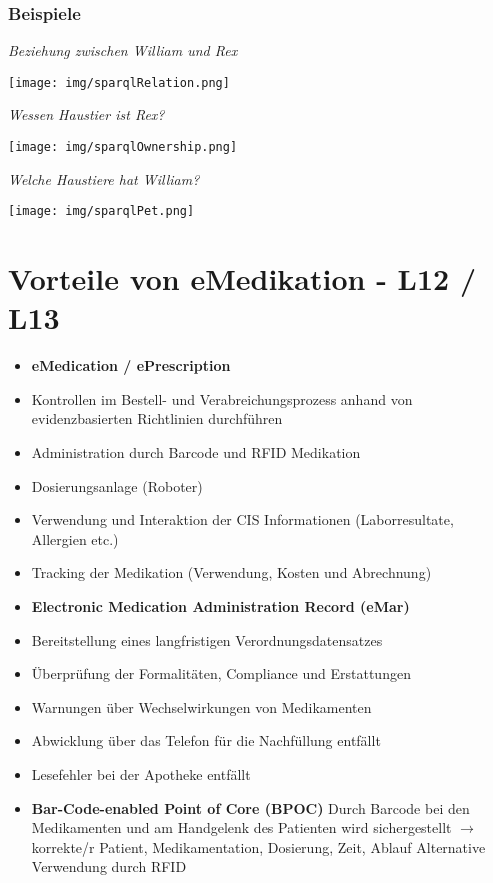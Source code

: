 \documentclass{report}
\newenvironment{Figure}
	{\par\medskip\noindent\minipage{\linewidth}}
	{\endminipage\par\medskip}
\theoremstyle{definition}
\theoremstyle{example}
\begin{document}
\subsection{Beispiele}
\textit{Beziehung zwischen William und Rex}
\begin{Figure}
   \centering
   \texttt{[image: img/sparqlRelation.png]}
      \label{fig:Antwort Frage 1}
\end{Figure}

\textit{Wessen Haustier ist Rex?}
\begin{Figure}
   \centering
   \texttt{[image: img/sparqlOwnership.png]}
      \label{fig:Antwort Frage 2}
\end{Figure}

\textit{Welche Haustiere hat William?}
\begin{Figure}
   \centering
   \texttt{[image: img/sparqlPet.png]}
      \label{fig:Antwort Frage 3}
\end{Figure}

\chapter{Vorteile von eMedikation - L12 / L13}

\begin{itemize}
   \item \textbf{eMedication / ePrescription}
   \item Kontrollen im Bestell- und Verabreichungsprozess anhand von evidenzbasierten Richtlinien durchführen
   \item Administration durch Barcode und RFID Medikation
   \item Dosierungsanlage (Roboter)
   \item Verwendung und Interaktion der CIS Informationen (Laborresultate, Allergien etc.)
   \item Tracking der Medikation (Verwendung, Kosten und Abrechnung)
   \item \textbf{Electronic Medication Administration Record (eMar)}
   \item Bereitstellung eines langfristigen Verordnungsdatensatzes
   \item Überprüfung der Formalitäten, Compliance und Erstattungen
   \item Warnungen über Wechselwirkungen von Medikamenten
   \item Abwicklung über das Telefon für die Nachfüllung entfällt
   \item Lesefehler bei der Apotheke entfällt
   \item \textbf{Bar-Code-enabled Point of Core (BPOC)}
   \subitem Durch Barcode bei den Medikamenten und am Handgelenk des Patienten wird sichergestellt $\rightarrow$ korrekte/r Patient, Medikamentation, Dosierung, Zeit, Ablauf
   \subitem Alternative Verwendung durch RFID
\end{itemize}
\end{document}
